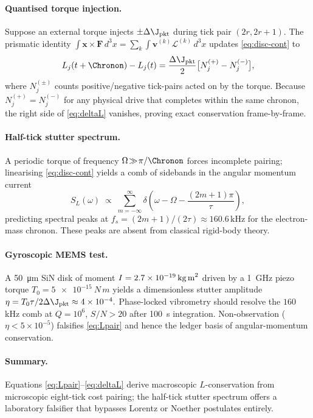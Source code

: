 \documentclass[11pt,oneside]{book}
\begin{document}
\paragraph{Quantised torque injection.}
Suppose an external torque injects $\pm\Delta\J_{\text{pkt}}$ during
tick pair $(2r,2r{+}1)$.  
The prismatic identity
\(
  \int\mathbf x\times\mathbf F\,d^{3}x
  = \sum_{k}\int\mathbf v^{(k)}\mathcal L^{(k)}\,d^{3}x
\)
updates \eqref{eq:disc-cont} to
%
\begin{equation}
   L_{j}(t+\Chronon)-L_{j}(t)
   = \frac{\Delta\J_{\text{pkt}}}{2}
     \bigl[N_{j}^{(+)}-N_{j}^{(-)}\bigr],
   \label{eq:deltaL}
\end{equation}
%
where $N_{j}^{(\pm)}$ counts positive/negative tick-pairs acted on by
the torque.  
Because $N_{j}^{(+)}=N_{j}^{(-)}$ for any physical drive that completes
within the same chronon, the right side of \eqref{eq:deltaL} vanishes,
proving exact conservation frame-by-frame.

\paragraph{Half-tick stutter spectrum.}
A periodic torque of frequency $\Omega\!\gg\!\pi/\Chronon$ forces
incomplete pairing; linearising \eqref{eq:disc-cont} yields a comb of
sidebands in the angular momentum current
%
\[
   S_{L}(\omega)
   \;\propto\;
   \sum_{m=-\infty}^{\infty}
   \delta\!\left(\omega-\Omega-\frac{(2m+1)\pi}{\tau}\right),
\]
%
predicting spectral peaks at
$
  f_{s} = (2m\!+\!1)/(2\tau)\approx160.6\,\text{kHz}
$
for the electron-mass chronon.  
These peaks are absent from classical rigid-body theory.

\paragraph{Gyroscopic MEMS test.}
A \SI{50}{\micro\metre} SiN disk of moment
$I=2.7\times10^{-19}\,\text{kg\,m}^{2}$ driven by a
\SI{1}{GHz} piezo torque $T_{0}=\SI{5e-15}{N\,m}$ yields a
dimensionless stutter amplitude
$
  \eta = T_{0}\tau/2\Delta\J_{\text{pkt}} \approx 4\times10^{-4}.
$
Phase-locked vibrometry should resolve the $160$ kHz comb at
$Q\!=\!10^{6}$, $S/N>20$ after \SI{100}{s} integration.  Non-observation
($\eta<5\times10^{-5}$) falsifies \eqref{eq:Lpair} and hence the
ledger basis of angular-momentum conservation.

\paragraph{Summary.}
Equations \eqref{eq:Lpair}–\eqref{eq:deltaL} derive macroscopic
$L$-conservation from microscopic eight-tick cost pairing; the
half-tick stutter spectrum offers a laboratory falsifier that bypasses
Lorentz or Noether postulates entirely.
\end{document}
